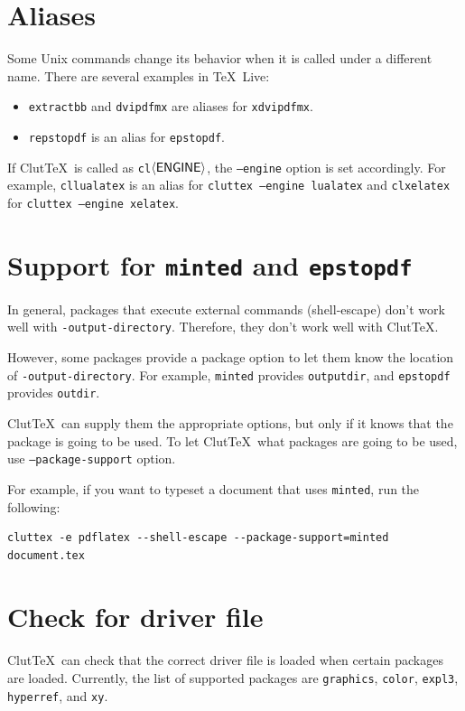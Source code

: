 \documentclass[a4paper]{report}
\newcommand\ClutTeX{Clut\TeX}
\newcommand\texpkg[1]{\texttt{#1}}
\newcommand\metavar[1]{\textnormal{\textsf{#1}}}
\begin{document}
\section{Aliases}
Some Unix commands change its behavior when it is called under a different name.
There are several examples in \TeX\ Live:
\begin{itemize}
\item \texttt{extractbb} and \texttt{dvipdfmx} are aliases for \texttt{xdvipdfmx}.
\item \texttt{repstopdf} is an alias for \texttt{epstopdf}.
\end{itemize}

If \ClutTeX\ is called as \texttt{cl}\(\langle\text{\metavar{ENGINE}}\rangle\), the \texttt{--engine} option is set accordingly.
For example, \texttt{cllualatex} is an alias for \texttt{cluttex --engine lualatex} and \texttt{clxelatex} for \texttt{cluttex --engine xelatex}.


\section{Support for \texpkg{minted} and \texpkg{epstopdf}}
In general, packages that execute external commands (shell-escape) don't work well with \texttt{-output-directory}.
Therefore, they don't work well with \ClutTeX.

However, some packages provide a package option to let them know the location of \texttt{-output-directory}.
For example, \texpkg{minted} provides \texttt{outputdir}, and \texpkg{epstopdf} provides \texttt{outdir}.

\ClutTeX\ can supply them the appropriate options, but only if it knows that the package is going to be used.
To let \ClutTeX\ what packages are going to be used, use \texttt{--package-support} option.

For example, if you want to typeset a document that uses \texpkg{minted}, run the following:
\begin{verbatim}
cluttex -e pdflatex --shell-escape --package-support=minted document.tex
\end{verbatim}

\section{Check for driver file}

\ClutTeX\ can check that the correct driver file is loaded when certain packages are loaded.
Currently, the list of supported packages are \texpkg{graphics}, \texpkg{color}, \texpkg{expl3}, \texpkg{hyperref}, and \texpkg{xy}.
\end{document}
